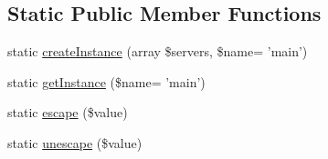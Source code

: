 \subsection*{Static Public Member Functions}
\begin{DoxyCompactItemize}
\item 
static \hyperlink{classCassandra_a0eb2d8394ec9b98363eb2ea13c3390a6}{createInstance} (array \$servers, \$name= 'main')
\item 
static \hyperlink{classCassandra_accae5522cc54a2f679f7925752d14c01}{getInstance} (\$name= 'main')
\item 
static \hyperlink{classCassandra_add0d5cd1c9ce26092db0124971e39d11}{escape} (\$value)
\item 
static \hyperlink{classCassandra_add4a1aed054f96ad74938e149b0ed0ef}{unescape} (\$value)
\end{DoxyCompactItemize}
